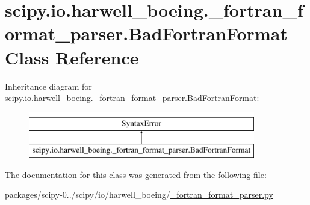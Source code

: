 \hypertarget{classscipy_1_1io_1_1harwell__boeing_1_1__fortran__format__parser_1_1BadFortranFormat}{}\section{scipy.\+io.\+harwell\+\_\+boeing.\+\_\+fortran\+\_\+format\+\_\+parser.\+Bad\+Fortran\+Format Class Reference}
\label{classscipy_1_1io_1_1harwell__boeing_1_1__fortran__format__parser_1_1BadFortranFormat}
Inheritance diagram for scipy.\+io.\+harwell\+\_\+boeing.\+\_\+fortran\+\_\+format\+\_\+parser.\+Bad\+Fortran\+Format\+:\begin{figure}[H]
\begin{center}
\leavevmode
\includegraphics[height=2.000000cm]{classscipy_1_1io_1_1harwell__boeing_1_1__fortran__format__parser_1_1BadFortranFormat}
\end{center}
\end{figure}


The documentation for this class was generated from the following file\+:\begin{DoxyCompactItemize}
\item 
packages/scipy-\/0../scipy/io/harwell\+\_\+boeing/\hyperlink{__fortran__format__parser_8py}{\+\_\+fortran\+\_\+format\+\_\+parser.\+py}\end{DoxyCompactItemize}
